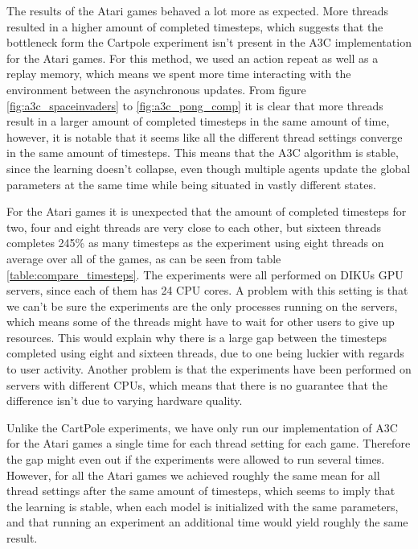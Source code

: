 \documentclass[11pt]{article}
\begin{document}
The results of the Atari games behaved a lot more as expected.
More threads resulted in a higher amount of completed timesteps,
which suggests that the bottleneck form the Cartpole experiment isn't present in
the A3C implementation for the Atari games.
For this method, we used an action repeat as well as a replay memory,
which means we spent more time interacting with the environment
between the asynchronous updates.
From figure \ref{fig:a3c_spaceinvaders} to \ref{fig:a3c_pong_comp}
it is clear that more threads result in a larger amount of completed timesteps
in the same amount of time,
however, it is notable that it seems like all the different thread
settings converge in the same amount of timesteps.
This means that the A3C algorithm is stable, since the learning
doesn't collapse, even though multiple agents update the global parameters at the same time 
while being situated in vastly different states.


For the Atari games it is unexpected that the amount of completed timesteps
for two, four and eight threads are very close to each other, but
sixteen threads completes 245\% as many timesteps as the experiment using eight
threads on average over all of the games, as can be seen from table \ref{table:compare_timesteps}.
The experiments were all performed on DIKUs GPU servers, since each of them
has 24 CPU cores.
A problem with this setting is that we can't be sure 
the experiments are the only processes running on the servers, which means
some of the threads might have to wait for other users to
give up resources.
This would explain why there is a large gap between the timesteps
completed using eight and sixteen threads, due to one
being luckier with regards to user activity.
Another problem is that the experiments have been performed on servers with different CPUs,
which means that there is no guarantee that the difference isn't due to
varying hardware quality.

Unlike the CartPole experiments, we have only run our implementation
of A3C for the Atari games a single time for each thread setting for each game.
Therefore the gap might even out if the experiments were allowed to run
several times.
However, for all the Atari games we achieved roughly the same mean
for all thread settings after the same amount of timesteps,
which seems to imply that the learning is stable, when each model is initialized
with the same parameters, and that running an experiment an additional time would yield
roughly the same result.
\end{document}
